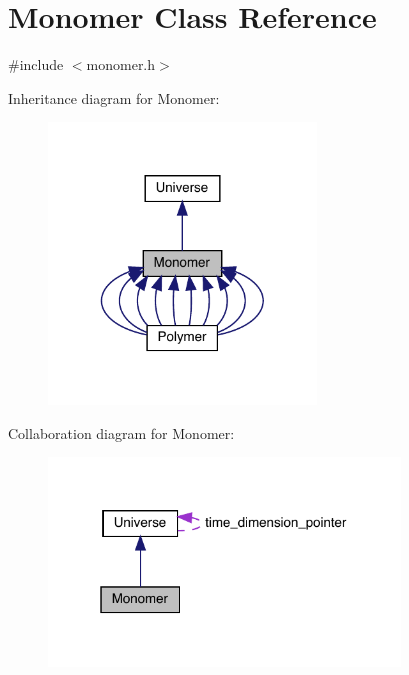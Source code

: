 \hypertarget{class_monomer}{}\section{Monomer Class Reference}
\label{class_monomer}


{\ttfamily \#include $<$monomer.\+h$>$}



Inheritance diagram for Monomer\+:\nopagebreak
\begin{figure}[H]
\begin{center}
\leavevmode
\includegraphics[width=202pt]{class_monomer__inherit__graph}
\end{center}
\end{figure}


Collaboration diagram for Monomer\+:
\nopagebreak
\begin{figure}[H]
\begin{center}
\leavevmode
\includegraphics[width=265pt]{class_monomer__coll__graph}
\end{center}
\end{figure}
